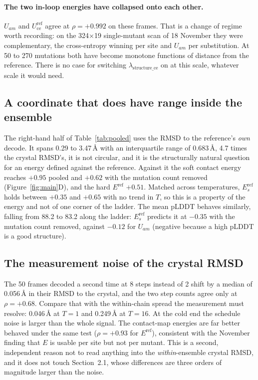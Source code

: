 \documentclass[11pt,a4paper]{article}
\begin{document}
\paragraph{The two in-loop energies have collapsed onto each other.} $U_{am}$ and
$U_{\mathrm{ce}}^{\mathrm{ref}}$ agree at $\rho=+0.992$ on these frames. That is a change of
regime worth recording: on the 324$\times$19 single-mutant scan of 18 November they were
complementary, the cross-entropy winning per site and $U_{am}$ per substitution. At 50 to
270 mutations both have become monotone functions of distance from the reference. There is
no case for switching $\lambda_{\mathrm{structure\_ce}}$ on at this scale, whatever scale it
would need.

\subsection{A coordinate that does have range inside the ensemble}

The right-hand half of Table~\ref{tab:pooled} uses the RMSD to the reference's \emph{own}
decode. It spans 0.29 to 3.47\,\AA{} with an interquartile range of 0.683\,\AA, 4.7 times
the crystal RMSD's, it is not circular, and it is the structurally natural question for an
energy defined against the reference. Against it the soft contact energy reaches $+0.95$
pooled and $+0.62$ with the mutation count removed (Figure~\ref{fig:main}D), and the hard
$E^{\mathrm{ref}}$ $+0.51$. Matched across temperatures, $E_s^{\mathrm{ref}}$ holds between
$+0.35$ and $+0.65$ with no trend in $T$, so this is a property of the energy and not of one
corner of the ladder. The mean pLDDT behaves similarly, falling from 88.2 to 83.2 along the
ladder: $E_s^{\mathrm{ref}}$ predicts it at $-0.35$ with the mutation count removed, against
$-0.12$ for $U_{am}$ (negative because a high pLDDT is a good structure).

\subsection{The measurement noise of the crystal RMSD}

The 50 frames decoded a second time at 8 steps instead of 2 shift by a median of
0.056\,\AA{} in their RMSD to the crystal, and the two step counts agree only at
$\rho=+0.68$. Compare that with the within-chain spread the measurement must resolve:
0.046\,\AA{} at $T=1$ and 0.249\,\AA{} at $T=16$. At the cold end the schedule noise is
larger than the whole signal. The contact-map energies are far better behaved under the same
test ($\rho=+0.93$ for $E^{\mathrm{ref}}$), consistent with the November finding that $E$ is
usable per site but not per mutant. This is a second, independent reason not to read
anything into the \emph{within}-ensemble crystal RMSD, and it does not touch
Section~2.1, whose differences are three orders of magnitude larger than the noise.
\end{document}
